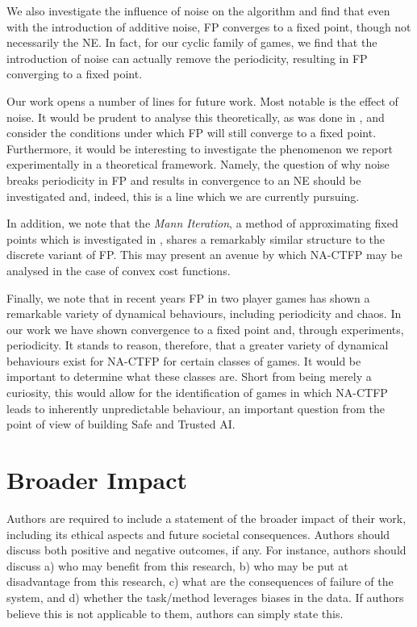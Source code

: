 \documentclass{article}
\theoremstyle{definition}
\begin{document}
	We also investigate the influence of noise on the algorithm and find that even with the introduction of additive noise, FP converges to a fixed point, though not necessarily the NE. In fact, for our cyclic family of games, we find that the introduction of noise can actually remove the periodicity, resulting in FP converging to a fixed point.
	
	Our work opens a number of lines for future work. Most notable is the effect of noise. It would be prudent to analyse this theoretically, as was done in \cite{MFGFP}, and consider the conditions under which FP will still converge to a fixed point. Furthermore, it would be interesting to investigate the phenomenon we report experimentally in a theoretical framework. Namely, the question of why noise breaks periodicity in FP and results in convergence to an NE should be investigated and, indeed, this is a line which we are currently pursuing.
	
	In addition, we note that the \emph{Mann Iteration}, a method of approximating fixed points which is investigated in \cite{Parise2020}, shares a remarkably similar structure to the discrete variant of FP. This may present an avenue by which NA-CTFP may be analysed in the case of convex cost functions. 
	
	Finally, we note that in recent years FP in two player games has shown a remarkable variety of dynamical behaviours, including periodicity and chaos. In our work we have shown convergence to a fixed point and, through experiments, periodicity. It stands to reason, therefore, that a greater variety of dynamical behaviours exist for NA-CTFP for certain classes of games. It would be important to determine what these classes are. Short from being merely a curiosity, this would allow for the identification of games in which NA-CTFP leads to inherently unpredictable behaviour, an important question from the point of view of building Safe and Trusted AI.

\section*{Broader Impact}

Authors are required to include a statement of the broader impact of their work, including its ethical aspects and future societal consequences. 
Authors should discuss both positive and negative outcomes, if any. For instance, authors should discuss a) 
who may benefit from this research, b) who may be put at disadvantage from this research, c) what are the consequences of failure of the system, and d) whether the task/method leverages
biases in the data. If authors believe this is not applicable to them, authors can simply state this.
\end{document}
